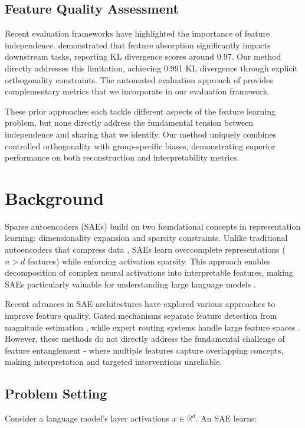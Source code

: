 \documentclass{article} %
\begin{document}
\subsection{Feature Quality Assessment}
Recent evaluation frameworks have highlighted the importance of feature independence. \cite{chaninAbsorptionStudyingFeature2024} demonstrated that feature absorption significantly impacts downstream tasks, reporting KL divergence scores around 0.97. Our method directly addresses this limitation, achieving 0.991 KL divergence through explicit orthogonality constraints. The automated evaluation approach of \cite{pauloAutomaticallyInterpretingMillions2024} provides complementary metrics that we incorporate in our evaluation framework.

These prior approaches each tackle different aspects of the feature learning problem, but none directly address the fundamental tension between independence and sharing that we identify. Our method uniquely combines controlled orthogonality with group-specific biases, demonstrating superior performance on both reconstruction and interpretability metrics.

\section{Background}
\label{sec:background}

Sparse autoencoders (SAEs) build on two foundational concepts in representation learning: dimensionality expansion and sparsity constraints. Unlike traditional autoencoders that compress data \cite{goodfellow2016deep}, SAEs learn overcomplete representations ($n > d$ features) while enforcing activation sparsity. This approach enables decomposition of complex neural activations into interpretable features, making SAEs particularly valuable for understanding large language models \cite{gaoScalingEvaluatingSparse}.

Recent advances in SAE architectures have explored various approaches to improve feature quality. Gated mechanisms separate feature detection from magnitude estimation \cite{rajamanoharanImprovingDictionaryLearning2024}, while expert routing systems handle large feature spaces \cite{mudideEfficientDictionaryLearning2024a}. However, these methods do not directly address the fundamental challenge of feature entanglement - where multiple features capture overlapping concepts, making interpretation and targeted interventions unreliable.

\subsection{Problem Setting}
Consider a language model's layer activations $x \in \mathbb{R}^d$. An SAE learns:
\end{document}
